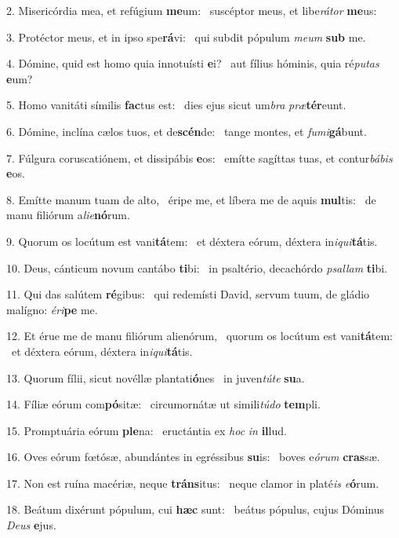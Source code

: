 2. Misericórdia mea, et refúgium \textbf{me}um: \ast\  suscéptor meus, et libe\textit{rá}\textit{tor} \textbf{me}us:\

3. Protéctor meus, et in ipso spe\textbf{rá}vi: \ast\  qui subdit pópulum \textit{me}\textit{um} \textbf{sub} me.\

4. Dómine, quid est homo quia innotuísti \textbf{e}i? \ast\  aut fílius hóminis, quia ré\textit{pu}\textit{tas} \textbf{e}um?\

5. Homo vanitáti símilis \textbf{fac}tus est: \ast\  dies ejus sicut um\textit{bra} \textit{præ}\textbf{tér}eunt.\

6. Dómine, inclína cælos tuos, et de\textbf{scén}de: \ast\  tange montes, et \textit{fu}\textit{mi}\textbf{gá}bunt.\

7. Fúlgura coruscatiónem, et dissipábis \textbf{e}os: \ast\  emítte sagíttas tuas, et contur\textit{bá}\textit{bis} \textbf{e}os.\

8. Emítte manum tuam de alto, \dag\  éripe me, et líbera me de aquis \textbf{mul}tis: \ast\  de manu filiórum a\textit{li}\textit{e}\textbf{nó}rum.\

9. Quorum os locútum est vani\textbf{tá}tem: \ast\  et déxtera eórum, déxtera in\textit{i}\textit{qui}\textbf{tá}tis.\

10. Deus, cánticum novum cantábo \textbf{ti}bi: \ast\  in psaltério, decachórdo \textit{psal}\textit{lam} \textbf{ti}bi.\

11. Qui das salútem \textbf{ré}gibus: \ast\  qui redemísti David, servum tuum, de gládio malígno: \textit{é}\textit{ri}\textbf{pe} me.\

12. Et érue me de manu filiórum alienórum, \dag\  quorum os locútum est vani\textbf{tá}tem: \ast\  et déxtera eórum, déxtera in\textit{i}\textit{qui}\textbf{tá}tis.\

13. Quorum fílii, sicut novéllæ plantati\textbf{ó}nes \ast\  in juven\textit{tú}\textit{te} \textbf{su}a.\

14. Fíliæ eórum com\textbf{pó}sitæ: \ast\  circumornátæ ut simili\textit{tú}\textit{do} \textbf{tem}pli.\

15. Promptuária eórum \textbf{ple}na: \ast\  eructántia ex \textit{hoc} \textit{in} \textbf{il}lud.\

16. Oves eórum fœtósæ, abundántes in egréssibus \textbf{su}is: \ast\  boves e\textit{ó}\textit{rum} \textbf{cras}sæ.\

17. Non est ruína macériæ, neque \textbf{tráns}itus: \ast\  neque clamor in platé\textit{is} \textit{e}\textbf{ó}rum.\

18. Beátum dixérunt pópulum, cui \textbf{hæc} sunt: \ast\  beátus pópulus, cujus Dóminus \textit{De}\textit{us} \textbf{e}jus.\

